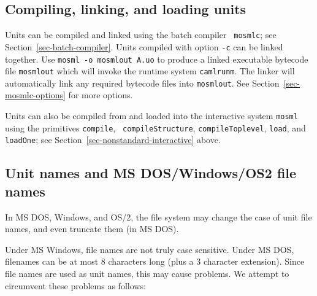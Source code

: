 \documentclass[fleqn]{article}
\begin{document}
\subsection{Compiling, linking, and loading units}

Units can be compiled and linked using the batch compiler {\tt
  mosmlc}; see Section~\ref{sec-batch-compiler}.  Units compiled with
option {\tt -c} can be linked together.  Use {\tt mosml -o mosmlout
  A.uo} to produce a linked executable bytecode file {\tt mosmlout}
which will invoke the runtime system {\tt camlrunm}.  The linker will
automatically link any required bytecode files into {\tt mosmlout}.
See Section~\ref{sec-mosmlc-options} for more options.

Units can also be compiled from and loaded into the interactive system
{\tt mosml} using the primitives {\tt compile}, {\tt
  compileStructure}, {\tt compileToplevel}, {\tt load}, and
\texttt{loadOne}; see Section~\ref{sec-nonstandard-interactive} above.


\subsection{Unit names and MS DOS/Windows/OS2 file names}

In MS DOS, Windows, and OS/2, the file system may change the case of
unit file names, and even truncate them (in MS DOS)\@.

Under MS Windows, file names are not truly case sensitive.  Under MS
DOS, filenames can be at most 8 characters long (plus a 3 character
extension).  Since file names are used as unit names, this may cause
problems.  We attempt to circumvent these problems as follows:
\end{document}
